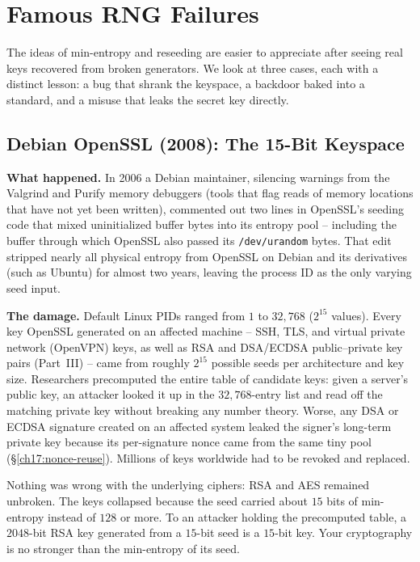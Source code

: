 \section{Famous RNG Failures}
\label{ch17:failures}

The ideas of min-entropy and reseeding are easier to appreciate after seeing real keys recovered from broken generators. We look at three cases, each with a distinct lesson: a bug that shrank the keyspace, a backdoor baked into a standard, and a misuse that leaks the secret key directly.

\subsection{Debian OpenSSL (2008): The 15-Bit Keyspace}
\label{ch17:debian}

\begin{attackbox}
\textbf{What happened.} In 2006 a Debian maintainer, silencing warnings from the Valgrind and Purify memory debuggers (tools that flag reads of memory locations that have not yet been written), commented out two lines in OpenSSL's seeding code that mixed uninitialized buffer bytes into its entropy pool -- including the buffer through which OpenSSL also passed its \texttt{/dev/urandom} bytes. That edit stripped nearly all physical entropy from OpenSSL on Debian and its derivatives (such as Ubuntu) for almost two years, leaving the process ID as the only varying seed input.

\textbf{The damage.} Default Linux PIDs ranged from $1$ to $32{,}768$ ($2^{15}$ values). Every key OpenSSL generated on an affected machine -- SSH, TLS, and virtual private network (OpenVPN) keys, as well as RSA and DSA/ECDSA public--private key pairs (Part~III) -- came from roughly $2^{15}$ possible seeds per architecture and key size. Researchers precomputed the entire table of candidate keys: given a server's public key, an attacker looked it up in the $32{,}768$-entry list and read off the matching private key without breaking any number theory. Worse, any DSA or ECDSA signature created on an affected system leaked the signer's long-term private key because its per-signature nonce came from the same tiny pool (\S\ref{ch17:nonce-reuse}). Millions of keys worldwide had to be revoked and replaced.
\end{attackbox}

\begin{intuitionbox}
Nothing was wrong with the underlying ciphers: RSA and AES remained unbroken. The keys collapsed because the seed carried about $15$ bits of min-entropy instead of $128$ or more. To an attacker holding the precomputed table, a $2048$-bit RSA key generated from a $15$-bit seed is a $15$-bit key. Your cryptography is no stronger than the min-entropy of its seed.
\end{intuitionbox}

